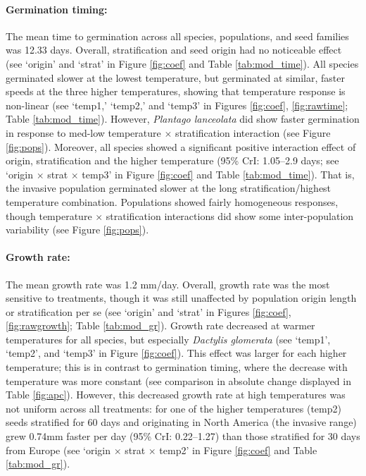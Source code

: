 \documentclass[12pt]{article}\usepackage[]{graphicx}\usepackage[]{color}
\begin{document}
	\paragraph{Germination timing:} The mean time to germination across all species, populations, and seed families was 12.33 days.   Overall, stratification and seed origin had no noticeable effect (see `origin' and `strat' in Figure \ref{fig:coef} and Table \ref{tab:mod_time}). All species germinated slower at the lowest temperature, but germinated at similar, faster speeds at the three higher temperatures, showing that temperature response is non-linear  (see `temp1,' `temp2,' and `temp3' in Figures \ref{fig:coef}, \ref{fig:rawtime}; Table \ref{tab:mod_time}). However, \textit{Plantago lanceolata} did show faster germination in response to med-low temperature $\times$ stratification interaction (see Figure \ref{fig:pops}).  Moreover, all species showed a significant positive interaction effect of origin, stratification and the higher temperature (95\% CrI: 1.05--2.9 days; see `origin $\times$ strat $\times$ temp3' in Figure \ref{fig:coef} and Table \ref{tab:mod_time}). That is, the invasive population germinated slower at the long stratification/highest temperature combination. Populations showed fairly homogeneous responses, though temperature $\times$ stratification interactions did show some inter-population variability (see Figure \ref{fig:pops}). 
	\paragraph{Growth rate:} The mean growth rate was 1.2 mm/day. Overall, growth rate was the most sensitive to treatments, though it was still unaffected by population origin length or stratification per se (see `origin' and `strat' in Figures \ref{fig:coef}, \ref{fig:rawgrowth}; Table \ref{tab:mod_gr}). Growth rate decreased at warmer temperatures for all species, but especially \textit{Dactylis glomerata} (see `temp1', `temp2', and `temp3' in Figure \ref{fig:coef}). This effect was larger for each higher temperature; this is in contrast to germination timing, where the decrease with temperature was more constant (see comparison in absolute change displayed in Table \ref{fig:apc}). However, this decreased growth rate at high temperatures was not uniform across all treatments: for one of the higher temperatures (temp2) seeds stratified for 60 days and originating in North America (the invasive range) grew 0.74mm faster per day (95\% CrI: 0.22--1.27) than those stratified for 30 days from Europe (see `origin $\times$ strat $\times$ temp2' in Figure \ref{fig:coef} and Table \ref{tab:mod_gr}). 
\end{document}
